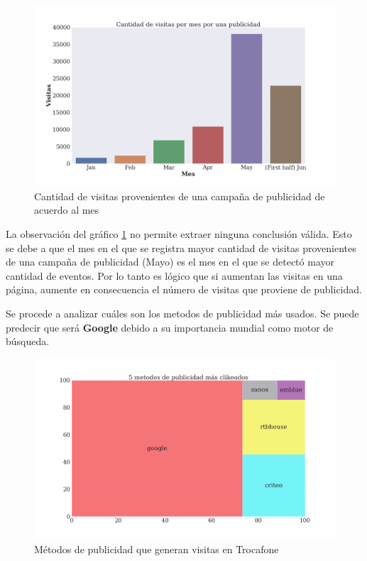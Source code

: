 \documentclass[a4paper]{article}
\begin{document}
\begin{figure}[h!]
	\includegraphics[width=\linewidth]{figures/16-presupuesto-barplot.png}
	\caption{Cantidad de visitas provenientes de una campaña de publicidad de acuerdo al mes}
	\label{fig:publicidad}
\end{figure}

La observación del gráfico \ref{fig:publicidad} no permite extraer ninguna conclusión válida. Esto se debe a que el mes en el que se registra mayor cantidad de visitas provenientes de una campaña de publicidad (Mayo) es el mes en el que se detectó mayor cantidad de eventos. Por lo tanto es lógico que si aumentan las visitas en una página, aumente en consecuencia el número de visitas que proviene de publicidad.

Se procede a analizar cuáles son los metodos de publicidad más usados. Se puede predecir que será \textbf{Google} debido a su importancia mundial como motor de búsqueda.

\begin{figure}[h!]
	\includegraphics[width=\linewidth]{figures/170-publicidad_clickeada-barplot.png}
	\caption{Métodos de publicidad que generan visitas en Trocafone}
	\label{fig:metodopublicidad}
\end{figure}
\end{document}
